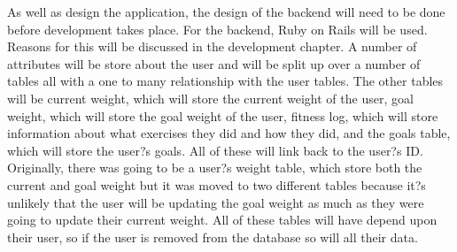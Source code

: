 As well as design the application, the design of the backend will need to be done before development takes place. For the backend, Ruby on Rails \citep{rails:2013} will be used. Reasons for this will be discussed in the development chapter. A number of attributes will be store about the user and will be split up over a number of tables all with a  one to many relationship with the user tables. The other tables will be current weight, which will store the current weight of the user, goal weight, which will store the goal weight of the user, fitness log, which will store information about what exercises they did and how they did, and the goals table, which will store the user?s goals. All of these will link back to the user?s ID. Originally, there was going to be a user?s weight table, which store both the current and goal weight but it was moved to two different tables because it?s unlikely that the user will be updating the goal weight as much as they were going to update their current weight. All of these tables will have depend upon their user, so if the user is removed from the database so will all their data. 